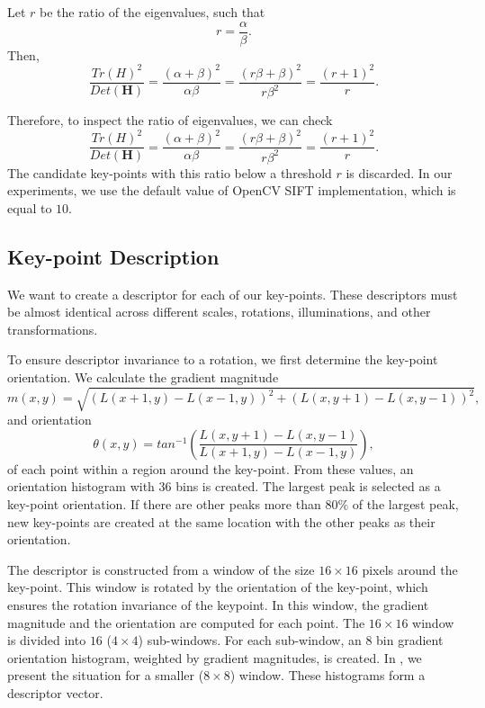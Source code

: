 Let $r$ be the ratio of the eigenvalues, such that
\begin{equation}
    r=\frac{\alpha}{\beta}.
\end{equation}
Then,
\begin{equation}
    \frac{Tr(H)^2}{Det(\boldsymbol{H})} = \frac{(\alpha+\beta)^2}{\alpha\beta}=\frac{(r\beta+\beta)^2}{r\beta^2} = \frac{(r+1)^2}{r}.
\end{equation}

Therefore, to inspect the ratio of eigenvalues, we can check
\begin{equation}
    \frac{Tr(H)^2}{Det(\boldsymbol{H})} = \frac{(\alpha+\beta)^2}{\alpha\beta}=\frac{(r\beta+\beta)^2}{r\beta^2} = \frac{(r+1)^2}{r}.
\end{equation}
The candidate key-points with this ratio below a threshold $r$ is discarded. In our experiments, we use the default value of OpenCV SIFT implementation, which is equal to $10$.

\subsection{Key-point Description}
We want to create a descriptor for each of our key-points. These descriptors must be almost identical across different scales, rotations, illuminations, and other transformations.

To ensure descriptor invariance to a rotation, we first determine the key-point orientation. We calculate the gradient magnitude
\begin{equation}
    m(x,y) = \sqrt{(L(x+1,y)-L(x-1,y))^2+(L(x,y+1)-L(x,y-1))^2},
\end{equation}
and orientation
\begin{equation}
    \theta(x,y) = tan^{-1}\left(\frac{L(x,y+1)-L(x,y-1)}{L(x+1,y)-L(x-1,y)}\right),
\end{equation}
of each point within a region around the key-point. From these values, an orientation histogram with $36$ bins is created. The largest peak is selected as a key-point orientation. If there are other peaks more than $80\%$ of the largest peak, new key-points are created at the same location with the other peaks as their orientation.

The descriptor is constructed from a window of the size $16\times16$ pixels around the key-point. This window is rotated by the orientation of the key-point, which ensures the rotation invariance of the keypoint. In this window, the gradient magnitude and the orientation are computed for each point. The $16\times16$ window is divided into $16$ ($4\times4$) sub-windows. For each sub-window, an $8$ bin gradient orientation histogram, weighted by gradient magnitudes, is created. In , we present the situation for a smaller ($8\times8$) window. These histograms form a descriptor vector.

